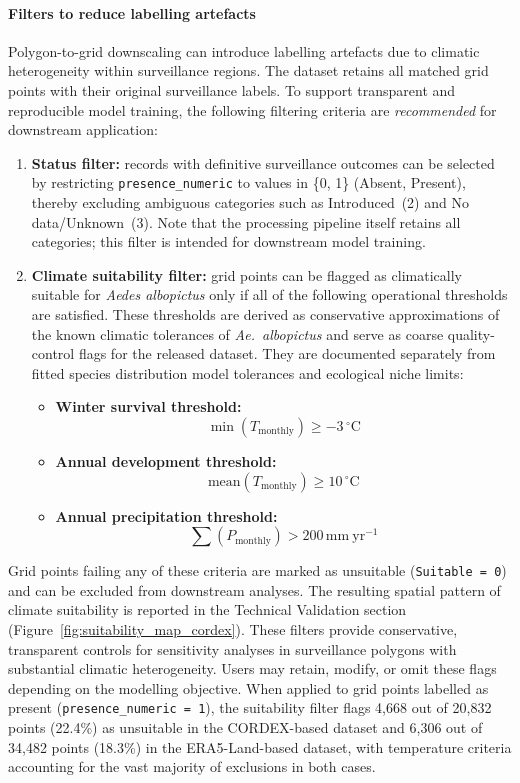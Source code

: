 \documentclass[11pt]{article}
\providecommand{\citep}[1]{\cite{#1}}
\begin{document}
\paragraph{Filters to reduce labelling artefacts}
Polygon-to-grid downscaling can introduce labelling artefacts due to climatic 
heterogeneity within surveillance regions. The dataset retains all matched 
grid points with their original surveillance labels. To support transparent 
and reproducible model training, the following filtering criteria are 
\emph{recommended} for downstream application:
\begin{enumerate}
    \item \textbf{Status filter:} records with definitive surveillance outcomes 
    can be selected by restricting \texttt{presence\_numeric} to values in 
    \{0, 1\} (Absent, Present), thereby excluding ambiguous 
    categories such as Introduced~(2) and No data/Unknown~(3). Note that the 
    processing pipeline itself retains all categories; this filter is intended 
    for downstream model training.
    \item \textbf{Climate suitability filter:} grid points can be flagged as 
    climatically suitable for \textit{Aedes albopictus} only if all of the 
    following operational thresholds are satisfied. These thresholds are 
    derived as conservative approximations of the known climatic tolerances 
    of \textit{Ae.\ albopictus} \citep{ecdc2024a} and serve as coarse
    quality-control flags for the released dataset. They are documented
    separately from fitted species distribution model tolerances and
    ecological niche limits:
    \begin{itemize}
        \item \textbf{Winter survival threshold:}
        \[
        \min(T_{\text{monthly}}) \geq -3\,^{\circ}\mathrm{C}
        \]
        \item \textbf{Annual development threshold:}
        \[
        \mathrm{mean}(T_{\text{monthly}}) \geq 10\,^{\circ}\mathrm{C}
        \]
        \item \textbf{Annual precipitation threshold:}
        \[
        \sum(P_{\text{monthly}}) > 200\,\mathrm{mm~yr^{-1}}
        \]
    \end{itemize}
\end{enumerate}
Grid points failing any of these criteria are marked as unsuitable 
(\texttt{Suitable = 0}) and can be excluded from downstream analyses. 
The resulting spatial pattern of climate suitability is reported in 
the Technical Validation section (Figure~\ref{fig:suitability_map_cordex}). These filters provide
conservative, transparent controls for sensitivity analyses in surveillance
polygons with substantial climatic heterogeneity. Users
may retain, modify, or omit these flags depending on the modelling objective.
When applied to grid points labelled as present 
(\texttt{presence\_numeric~=~1}), the suitability filter flags 
4,668 out of 20,832 points (22.4\%) as unsuitable in the CORDEX-based 
dataset and 6,306 out of 34,482 points (18.3\%) in the ERA5-Land-based 
dataset, with temperature criteria accounting for the vast majority of 
exclusions in both cases.
\end{document}
